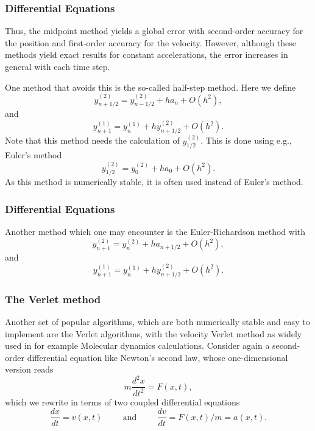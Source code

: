 \documentclass{beamer}
\begin{document}
\begin{frame}
\frametitle{Differential Equations}

\begin{block}{}
Thus, the midpoint method yields a global error with 
second-order accuracy for
the position and first-order accuracy for the velocity. However, although these methods yield exact results for
constant accelerations, the error increases in general with each time step.

One method that avoids this is the so-called half-step method. Here we define
\begin{equation}
   y^{(2)}_{n+1/2}=y^{(2)}_{n-1/2}+h a_{n}+O(h^2),
\end{equation}
and 
\begin{equation}
   y^{(1)}_{n+1}=y^{(1)}_{n}+hy^{(2)}_{n+1/2} +O(h^2).
\end{equation}
Note that this method needs the calculation of $y^{(2)}_{1/2}$. This is done using 
e.g., Euler's method
\begin{equation}
   y^{(2)}_{1/2}=y^{(2)}_{0}+h a_{0}+O(h^2).
\end{equation}
As this method is numerically stable, it is often used instead of Euler's method.
\end{block}
\end{frame}

\begin{frame}
\frametitle{Differential Equations}

\begin{block}{}
Another method which one may encounter is the Euler-Richardson method
with
\begin{equation}
   y^{(2)}_{n+1}=y^{(2)}_{n}+h a_{n+1/2}+O(h^2),
   \label{eq:er1}
\end{equation}
and 
\begin{equation}
   \label{eq:er2}
   y^{(1)}_{n+1}=y^{(1)}_{n}+hy^{(2)}_{n+1/2} +O(h^2).
\end{equation}
\end{block}
\end{frame}

\begin{frame}
\frametitle{The Verlet method}

\begin{block}{}
Another set of popular algorithms, which are both numerically stable and easy to implement are the
Verlet algorithms, with the velocity Verlet method as widely used in for example Molecular dynamics calculations. 
Consider again a second-order differential equation  like Newton's second law, whose one-dimensional
version reads
\[
m\frac{d^2 x}{dt^2}= F(x,t),
\]
which we rewrite in terms of two coupled differential equations
\[
\frac{dx}{dt}=v(x,t) \hspace{1cm}\mathrm{and}\hspace{1cm} \frac{dv}{dt}=F(x,t)/m=a(x,t).
\]
\end{block}
\end{frame}
\end{document}
